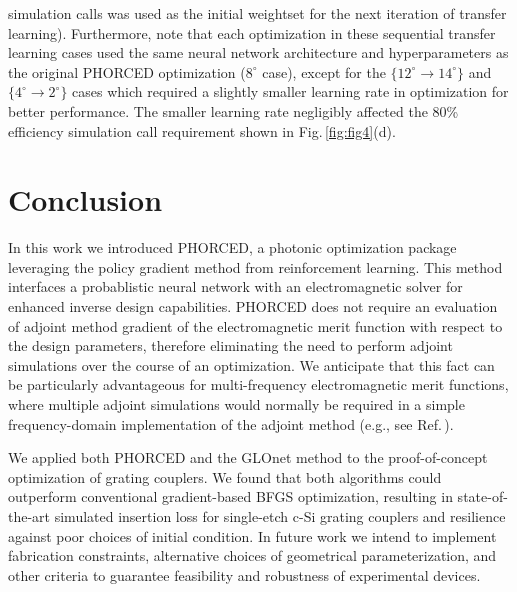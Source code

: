 \documentclass{article}
\begin{document}
simulation calls was used as the initial weightset for the next iteration of transfer learning). Furthermore, note that each optimization in these sequential transfer learning cases used the same neural network architecture and hyperparameters as the original PHORCED optimization ($8^\circ$ case), except for the $\{12^\circ \rightarrow 14^\circ\}$ and $\{4^\circ \rightarrow 2^\circ\}$ cases which required a slightly smaller learning rate in optimization for better performance. The smaller learning rate negligibly affected the 80\% efficiency simulation call requirement shown in Fig.\,\ref{fig:fig4}(d).  


\section{Conclusion}
In this work we introduced PHORCED, a photonic optimization package leveraging the policy gradient method from reinforcement learning. This method interfaces a probablistic neural network with an electromagnetic solver for enhanced inverse design capabilities. PHORCED does not require an evaluation of adjoint method gradient of the electromagnetic merit function with respect to the design parameters, therefore eliminating the need to perform adjoint simulations over the course of an optimization. We anticipate that this fact can be particularly advantageous for multi-frequency electromagnetic merit functions, where multiple adjoint simulations would normally be required in a simple frequency-domain implementation of the adjoint method (e.g., see Ref.\,\cite{hooten_adjoint_2020}).  

We applied both PHORCED and the GLOnet method to the proof-of-concept optimization of grating couplers. We found that both algorithms could outperform conventional gradient-based BFGS optimization, resulting in state-of-the-art simulated insertion loss for single-etch c-Si grating couplers and resilience against poor choices of initial condition. In future work we intend to implement fabrication constraints, alternative choices of geometrical parameterization, and other criteria to guarantee feasibility and robustness of experimental devices.
\end{document}
